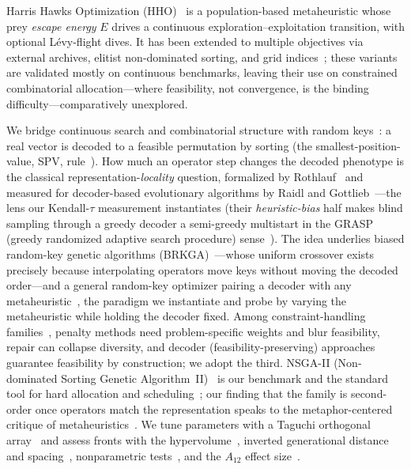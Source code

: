 \documentclass[runningheads]{llncs}
\begin{document}
Harris Hawks Optimization (HHO)~\cite{heidari} is a population-based metaheuristic whose prey \emph{escape energy} $E$ drives a continuous exploration--exploitation transition, with optional L\'evy-flight dives. It has been extended to multiple objectives via external archives, elitist non-dominated sorting, and grid indices~\cite{choo,jangir,cerci,kusoglu}; these variants are validated mostly on continuous benchmarks, leaving their use on constrained combinatorial allocation---where feasibility, not convergence, is the binding difficulty---comparatively unexplored.

We bridge continuous search and combinatorial structure with random keys~\cite{bean}: a real vector is decoded to a feasible permutation by sorting (the smallest-position-value, SPV, rule~\cite{tasgetiren}). How much an operator step changes the decoded phenotype is the classical representation-\emph{locality} question, formalized by Rothlauf~\cite{rothlauf} and measured for decoder-based evolutionary algorithms by Raidl and Gottlieb~\cite{raidl}---the lens our Kendall-$\tau$ measurement instantiates (their \emph{heuristic-bias} half makes blind sampling through a greedy decoder a semi-greedy multistart in the GRASP (greedy randomized adaptive search procedure) sense~\cite{feo}). The idea underlies biased random-key genetic algorithms (BRKGA)~\cite{goncalves,londe}---whose uniform crossover exists precisely because interpolating operators move keys without moving the decoded order---and a general random-key optimizer pairing a decoder with any metaheuristic~\cite{chaves}, the paradigm we instantiate and probe by varying the metaheuristic while holding the decoder fixed. Among constraint-handling families~\cite{rahimi}, penalty methods need problem-specific weights and blur feasibility, repair can collapse diversity, and decoder (feasibility-preserving) approaches guarantee feasibility by construction; we adopt the third. NSGA-II (Non-dominated Sorting Genetic Algorithm~II)~\cite{deb} is our benchmark and the standard tool for hard allocation and scheduling~\cite{zhang}; our finding that the family is second-order once operators match the representation speaks to the metaphor-centered critique of metaheuristics~\cite{aranha,sorensen}. We tune parameters with a Taguchi orthogonal array~\cite{alrafei,montgomery} and assess fronts with the hypervolume~\cite{zitzler}, inverted generational distance and spacing~\cite{coello}, nonparametric tests~\cite{derrac}, and the $A_{12}$ effect size~\cite{vargha}.

\end{document}
